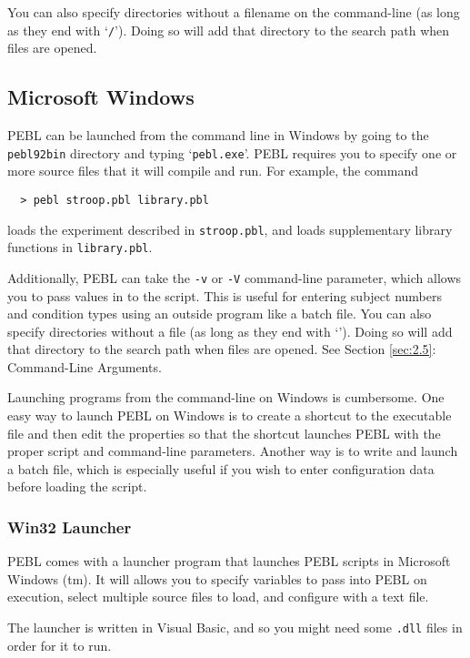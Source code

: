 You can also specify directories without a filename on the command-line (as long as they end with `\texttt{/}').  Doing so will add that directory to the search path when files are opened.

\subsection{ Microsoft Windows}

PEBL can be launched from the command line in Windows by going to the
\texttt{pebl\char92bin} directory and typing `\texttt{pebl.exe}'.  PEBL requires you to specify one or more source files that it will compile and run.  For
example, the command
\begin{verbatim}
  > pebl stroop.pbl library.pbl
\end{verbatim}
loads the experiment described in \texttt{stroop.pbl}, and loads supplementary library functions in \texttt{library.pbl}.


Additionally, PEBL can take the \texttt{-v} or \texttt{-V} command-line parameter, which allows you to pass values in to the script.  This is useful for
entering subject numbers and condition types using an outside program
like a batch file. You can also specify directories without a file (as long as they end with `\texttt{}').  Doing so will add that directory to the search path when files are opened. See Section \ref{sec:2.5}: Command-Line Arguments.

Launching programs from the command-line on Windows is cumbersome.
One easy way to launch PEBL on Windows is to create a shortcut to
the executable file and then edit the properties so that the shortcut
launches PEBL with the proper script and command-line parameters.
Another way is to write and launch a batch file, which is
especially useful if you wish to enter configuration data before loading the script.

\subsubsection{ Win32 Launcher}
PEBL comes with a launcher program that launches PEBL scripts in Microsoft Windows (tm).  It will allows you to specify 
variables to pass into PEBL on execution, select multiple source files
to load, and configure with a text file.

The launcher is written in Visual Basic, and so you might need some
\texttt{.dll} files in order for it to run.


